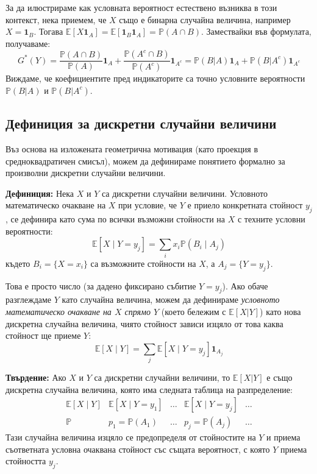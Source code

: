 \documentclass{article}
\begin{document}
За да илюстрираме как условната вероятност естествено възниква в този контекст, нека приемем, че $X$ също е бинарна случайна величина, например $X = \mathbf{1}_B$. Тогава $\mathbb{E}[X\mathbf{1}_A] = \mathbb{E}[\mathbf{1}_B \mathbf{1}_A] = \mathbb{P}(A \cap B)$. Замествайки във формулата, получаваме:
\[
G^*(Y) = \frac{\mathbb{P}(A \cap B)}{\mathbb{P}(A)} \mathbf{1}_A + \frac{\mathbb{P}(A^c \cap B)}{\mathbb{P}(A^c)} \mathbf{1}_{A^c} = \mathbb{P}(B|A)\mathbf{1}_A + \mathbb{P}(B|A^c)\mathbf{1}_{A^c}
\]
Виждаме, че коефициентите пред индикаторите са точно условните вероятности $\mathbb{P}(B|A)$ и $\mathbb{P}(B|A^c)$.

\subsection{Дефиниция за дискретни случайни величини}

Въз основа на изложената геометрична мотивация (като проекция в средноквадратичен смисъл), можем да дефинираме понятието формално за произволни дискретни случайни величини.

\textbf{Дефиниция:} Нека $X$ и $Y$ са дискретни случайни величини. Условното математическо очакване на $X$ при условие, че $Y$ е приело конкретната стойност $y_j$, се дефинира като сума по всички възможни стойности на $X$ с техните условни вероятности:
\[
\mathbb{E}[X \mid Y=y_j] = \sum_i x_i \mathbb{P}(B_i \mid A_j)
\]
където $B_i = \{X=x_i\}$ са възможните стойности на $X$, а $A_j = \{Y=y_j\}$. 

Това е просто число (за дадено фиксирано събитие $Y=y_j$). Ако обаче разглеждаме $Y$ като случайна величина, можем да дефинираме \emph{условното математическо очакване на $X$ спрямо $Y$} (което бележим с $\mathbb{E}[X|Y]$) като нова дискретна случайна величина, чиято стойност зависи изцяло от това каква стойност ще приеме $Y$:
\[
\mathbb{E}[X \mid Y] = \sum_j \mathbb{E}[X \mid Y=y_j] \mathbf{1}_{A_j}
\]

\textbf{Твърдение:} Ако $X$ и $Y$ са дискретни случайни величини, то $\mathbb{E}[X|Y]$ е също дискретна случайна величина, която има следната таблица на разпределение:
\[
\begin{array}{c|c|c|c|c}
\mathbb{E}[X \mid Y] & \mathbb{E}[X \mid Y=y_1] & \dots & \mathbb{E}[X \mid Y=y_j] & \dots \\
\hline
\mathbb{P} & p_1 = \mathbb{P}(A_1) & \dots & p_j = \mathbb{P}(A_j) & \dots
\end{array}
\]
Тази случайна величина изцяло се предопределя от стойностите на $Y$ и приема съответната условна очаквана стойност със същата вероятност, с която $Y$ приема стойността $y_j$.
\end{document}
